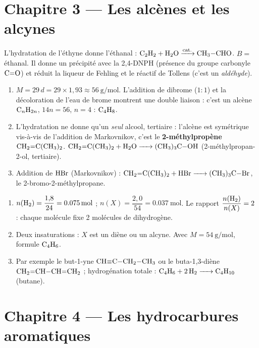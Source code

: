 \section{Chapitre 3 — Les alcènes et les alcynes}

L'hydratation de l'éthyne donne l'éthanal : $\ce{C2H2 + H2O ->[\text{cat.}] CH3-CHO}$.
$B = $ éthanal. Il donne un précipité avec la 2,4-DNPH (présence du groupe carbonyle
$\ce{C=O}$) et réduit la liqueur de Fehling et le réactif de Tollens (c'est un
\emph{aldéhyde}).

\begin{enumerate}[label=\arabic*)]
\item $M = 29\,d = 29\times1{,}93 \approx \SI{56}{\gram\per\mol}$. L'addition de
dibrome ($1{:}1$) et la décoloration de l'eau de brome montrent une double liaison :
c'est un alcène $\ce{C_nH_{2n}}$, $14n = 56$, $n = 4$ : $\ce{C4H8}$.
\item L'hydratation ne donne qu'un \emph{seul} alcool, tertiaire : l'alcène est
symétrique vis-à-vis de l'addition de Markovnikov, c'est le \textbf{2-méthylpropène}
$\ce{CH2=C(CH3)2}$. $\ce{CH2=C(CH3)2 + H2O -> (CH3)3C-OH}$ (2-méthylpropan-2-ol, tertiaire).
\item Addition de $\ce{HBr}$ (Markovnikov) : $\ce{CH2=C(CH3)2 + HBr -> (CH3)3C-Br}$,
le 2-bromo-2-méthylpropane.
\end{enumerate}

\begin{enumerate}[label=\arabic*)]
\item $n(\ce{H2}) = \dfrac{1{,}8}{24} = \SI{0.075}{\mol}$ ; $n(X) = \dfrac{2{,}0}{54} = \SI{0.037}{\mol}$.
Le rapport $\dfrac{n(\ce{H2})}{n(X)} = 2$ : chaque molécule fixe 2 molécules de dihydrogène.
\item Deux insaturations : $X$ est un diène ou un alcyne. Avec $M = \SI{54}{\gram\per\mol}$,
formule $\ce{C4H6}$.
\item Par exemple le but-1-yne $\ce{CH#C-CH2-CH3}$ ou le buta-1,3-diène
$\ce{CH2=CH-CH=CH2}$ ; hydrogénation totale : $\ce{C4H6 + 2 H2 -> C4H10}$ (butane).
\end{enumerate}

\section{Chapitre 4 — Les hydrocarbures aromatiques}

